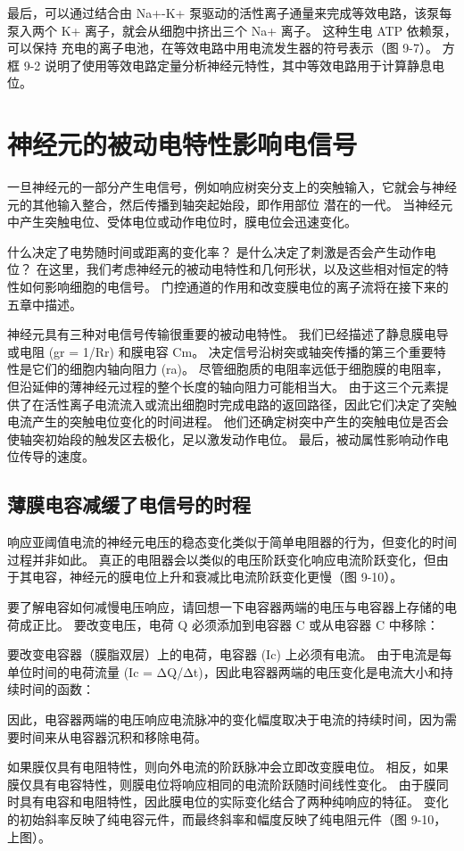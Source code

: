 最后，可以通过结合由 Na+-K+ 泵驱动的活性离子通量来完成等效电路，该泵每泵入两个 K+ 离子，就会从细胞中挤出三个 Na+ 离子。
这种生电 ATP 依赖泵，可以保持 充电的离子电池，在等效电路中用电流发生器的符号表示（图 9-7）。 
方框 9-2 说明了使用等效电路定量分析神经元特性，其中等效电路用于计算静息电位。


\section{神经元的被动电特性影响电信号}
一旦神经元的一部分产生电信号，例如响应树突分支上的突触输入，它就会与神经元的其他输入整合，然后传播到轴突起始段，即作用部位 潜在的一代。 
当神经元中产生突触电位、受体电位或动作电位时，膜电位会迅速变化。


什么决定了电势随时间或距离的变化率？ 是什么决定了刺激是否会产生动作电位？ 在这里，我们考虑神经元的被动电特性和几何形状，以及这些相对恒定的特性如何影响细胞的电信号。 门控通道的作用和改变膜电位的离子流将在接下来的五章中描述。

神经元具有三种对电信号传输很重要的被动电特性。 我们已经描述了静息膜电导或电阻 (gr = 1/Rr) 和膜电容 Cm。 决定信号沿树突或轴突传播的第三个重要特性是它们的细胞内轴向阻力 (ra)。 尽管细胞质的电阻率远低于细胞膜的电阻率，但沿延伸的薄神经元过程的整个长度的轴向阻力可能相当大。 由于这三个元素提供了在活性离子电流流入或流出细胞时完成电路的返回路径，因此它们决定了突触电流产生的突触电位变化的时间进程。 他们还确定树突中产生的突触电位是否会使轴突初始段的触发区去极化，足以激发动作电位。 最后，被动属性影响动作电位传导的速度。

\subsection{薄膜电容减缓了电信号的时程}
响应亚阈值电流的神经元电压的稳态变化类似于简单电阻器的行为，但变化的时间过程并非如此。 真正的电阻器会以类似的电压阶跃变化响应电流阶跃变化，但由于其电容，神经元的膜电位上升和衰减比电流阶跃变化更慢（图 9-10）。

要了解电容如何减慢电压响应，请回想一下电容器两端的电压与电容器上存储的电荷成正比。 要改变电压，电荷 Q 必须添加到电容器 C 或从电容器 C 中移除：

要改变电容器（膜脂双层）上的电荷，电容器 (Ic) 上必须有电流。 由于电流是每单位时间的电荷流量 (Ic = ΔQ/Δt)，因此电容器两端的电压变化是电流大小和持续时间的函数：

因此，电容器两端的电压响应电流脉冲的变化幅度取决于电流的持续时间，因为需要时间来从电容器沉积和移除电荷。

如果膜仅具有电阻特性，则向外电流的阶跃脉冲会立即改变膜电位。 相反，如果膜仅具有电容特性，则膜电位将响应相同的电流阶跃随时间线性变化。 由于膜同时具有电容和电阻特性，因此膜电位的实际变化结合了两种纯响应的特征。 变化的初始斜率反映了纯电容元件，而最终斜率和幅度反映了纯电阻元件（图 9-10，上图）。

